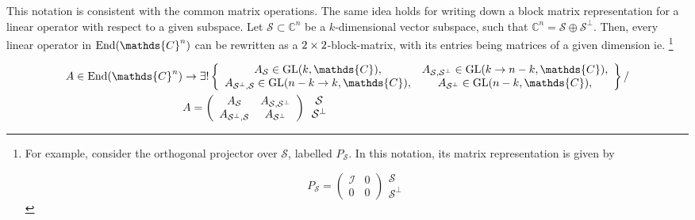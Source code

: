 \documentclass{homework}
\begin{document}
This notation is consistent with the common matrix operations. The same idea holds for writing down a  block matrix representation for a linear operator with respect to a given subspace. Let $\mathcal{S} \subset \mathds{C}^n$ be a $k$-dimensional vector subspace, such that $\mathds{C}^n = \mathcal{S} \oplus \mathcal{S}^{\perp}$. Then, every linear operator in $\textnormal{End}(\mathds{C}^n)$ can be rewritten as a $2 \times 2$-block-matrix, with its entries being matrices of a given dimension ie. \footnote{
For example, consider the orthogonal projector over $\mathcal{S}$, labelled $P_{\mathcal{S}}$. In this notation, its matrix representation is given by 

\begin{equation*}
    P_{\mathcal{S}} = \left( \begin{array}{cc}
       \mathcal{I} & 0 \\
       0 & 0
    \end{array} \right) \begin{array}{c}
         \mathcal{S} \\
         \mathcal{S}^\perp
    \end{array} 
\end{equation*}}

\begin{equation*}
\begin{split}
    A \in \textnormal{End}(\mathds{C}^n) &\rightarrow \exists! \left\{\begin{array}{cc}
        A_{\mathcal{S}} \in \textnormal{GL}(k, \mathds{C}),  &  A_{\mathcal{S}, \mathcal{S}^\perp} \in \textnormal{GL}(k \rightarrow n-k, \mathds{C}), \\
        A_{\mathcal{S}^\perp, \mathcal{S}}  \in \textnormal{GL}(n-k \rightarrow k, \mathds{C}), & A_{\mathcal{S}^\perp} \in \textnormal{GL}(n-k, \mathds{C}),
    \end{array} \right\} / \\
   &A = \left( \begin{array}{cc}
       A_{\mathcal{S}} & A_{\mathcal{S}, \mathcal{S}^\perp}  \\
       A_{\mathcal{S}^\perp, \mathcal{S}} & A_{\mathcal{S}^\perp} 
    \end{array} \right) \begin{array}{c}
         \mathcal{S} \\
         \mathcal{S}^\perp
    \end{array}
    \end{split}
\end{equation*}
\end{document}
